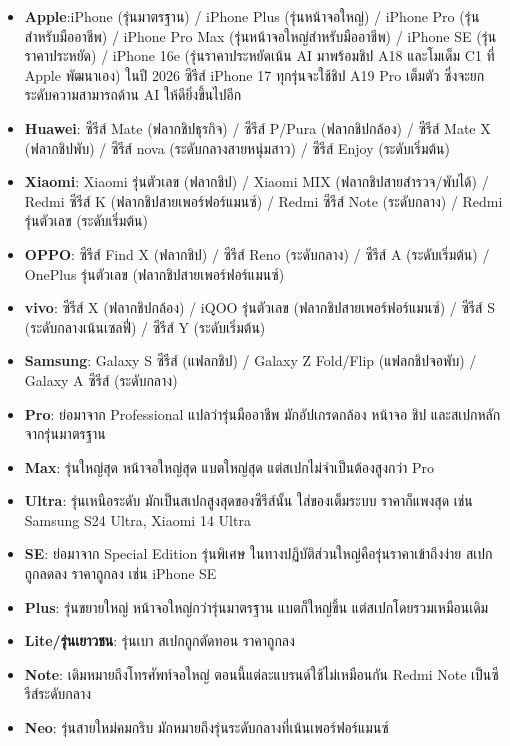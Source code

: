 \begin{itemize}
  \item \textbf{Apple}:iPhone (รุ่นมาตรฐาน) / iPhone Plus (รุ่นหน้าจอใหญ่) / iPhone Pro (รุ่นสำหรับมืออาชีพ) / iPhone Pro Max (รุ่นหน้าจอใหญ่สำหรับมืออาชีพ) / iPhone SE (รุ่นราคาประหยัด) / iPhone 16e (รุ่นราคาประหยัดเน้น AI มาพร้อมชิป A18 และโมเด็ม C1 ที่ Apple พัฒนาเอง) ในปี 2026 ซีรีส์ iPhone 17 ทุกรุ่นจะใช้ชิป A19 Pro เต็มตัว ซึ่งจะยกระดับความสามารถด้าน AI ให้ดียิ่งขึ้นไปอีก
  \item \textbf{Huawei}: ซีรีส์ Mate (ฟลากชิปธุรกิจ) / ซีรีส์ P/Pura (ฟลากชิปกล้อง) / ซีรีส์ Mate X (ฟลากชิปพับ) / ซีรีส์ nova (ระดับกลางสายหนุ่มสาว) / ซีรีส์ Enjoy (ระดับเริ่มต้น)
  \item \textbf{Xiaomi}: Xiaomi รุ่นตัวเลข (ฟลากชิป) / Xiaomi MIX (ฟลากชิปสายสำรวจ/พับได้) / Redmi ซีรีส์ K (ฟลากชิปสายเพอร์ฟอร์แมนซ์) / Redmi ซีรีส์ Note (ระดับกลาง) / Redmi รุ่นตัวเลข (ระดับเริ่มต้น)
  \item \textbf{OPPO}: ซีรีส์ Find X (ฟลากชิป) / ซีรีส์ Reno (ระดับกลาง) / ซีรีส์ A (ระดับเริ่มต้น) / OnePlus รุ่นตัวเลข (ฟลากชิปสายเพอร์ฟอร์แมนซ์)
  \item \textbf{vivo}: ซีรีส์ X (ฟลากชิปกล้อง) / iQOO รุ่นตัวเลข (ฟลากชิปสายเพอร์ฟอร์แมนซ์) / ซีรีส์ S (ระดับกลางเน้นเซลฟี่) / ซีรีส์ Y (ระดับเริ่มต้น)
  \item \textbf{Samsung}: Galaxy S ซีรีส์ (แฟลกชิป) / Galaxy Z Fold/Flip (แฟลกชิปจอพับ) / Galaxy A ซีรีส์ (ระดับกลาง)
\end{itemize}


\begin{itemize}
  \item \textbf{Pro}: ย่อมาจาก Professional แปลว่ารุ่นมืออาชีพ มักอัปเกรดกล้อง หน้าจอ ชิป และสเปกหลักจากรุ่นมาตรฐาน
  \item \textbf{Max}: รุ่นใหญ่สุด หน้าจอใหญ่สุด แบตใหญ่สุด แต่สเปกไม่จำเป็นต้องสูงกว่า Pro
  \item \textbf{Ultra}: รุ่นเหนือระดับ มักเป็นสเปกสูงสุดของซีรีส์นั้น ใส่ของเต็มระบบ ราคาก็แพงสุด เช่น Samsung S24 Ultra, Xiaomi 14 Ultra
  \item \textbf{SE}: ย่อมาจาก Special Edition รุ่นพิเศษ ในทางปฏิบัติส่วนใหญ่คือรุ่นราคาเข้าถึงง่าย สเปกถูกลดลง ราคาถูกลง เช่น iPhone SE
  \item \textbf{Plus}: รุ่นขยายใหญ่ หน้าจอใหญ่กว่ารุ่นมาตรฐาน แบตก็ใหญ่ขึ้น แต่สเปกโดยรวมเหมือนเดิม
  \item \textbf{Lite/รุ่นเยาวชน}: รุ่นเบา สเปกถูกตัดทอน ราคาถูกลง
  \item \textbf{Note}: เดิมหมายถึงโทรศัพท์จอใหญ่ ตอนนี้แต่ละแบรนด์ใช้ไม่เหมือนกัน Redmi Note เป็นซีรีส์ระดับกลาง
  \item \textbf{Neo}: รุ่นสายใหม่คมกริบ มักหมายถึงรุ่นระดับกลางที่เน้นเพอร์ฟอร์แมนซ์
\end{itemize}

